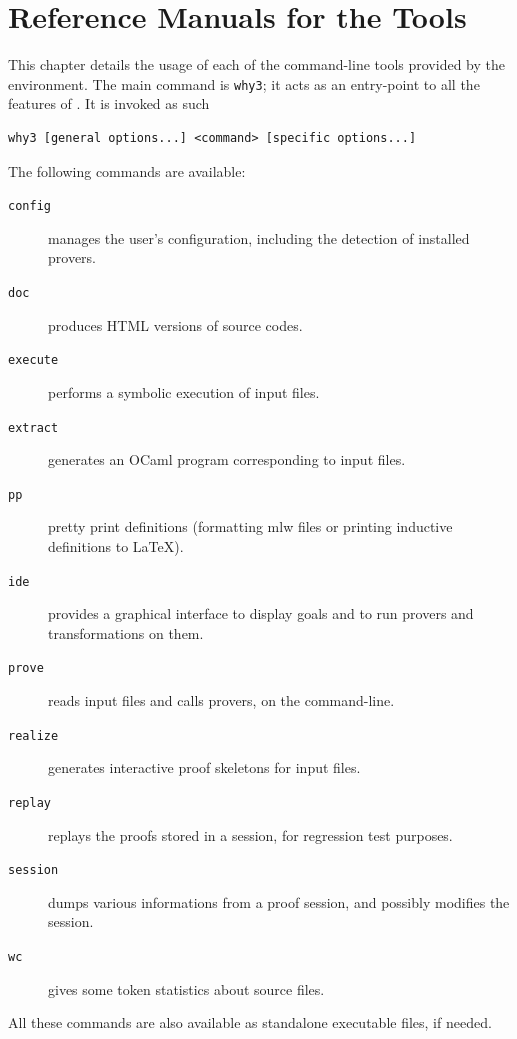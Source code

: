 \chapter{Reference Manuals for the \why Tools}
\label{chap:manpages}

This chapter details the usage of each of the command-line tools
provided by the \why environment. The main command is \texttt{why3};
it acts as an entry-point to all the features of \why. It is invoked
as such
\begin{verbatim}
why3 [general options...] <command> [specific options...]
\end{verbatim}

The following commands are available:
\begin{description}
\item[\texttt{config}] manages the user's configuration,
  including the detection of installed provers.
\item[\texttt{doc}] produces HTML versions of \why source codes.
\item[\texttt{execute}] performs a symbolic execution of \whyml
  input files.
\item[\texttt{extract}] generates an OCaml program corresponding to
  \whyml input files.
\item[\texttt{pp}] pretty print \whyml definitions (formatting mlw files
  or printing inductive definitions to \LaTeX).
\item[\texttt{ide}] provides a graphical interface to display goals
  and to run provers and transformations on them.
\item[\texttt{prove}] reads \whyml input files and calls
  provers, on the command-line.
\item[\texttt{realize}] generates interactive proof skeletons for
  \why input files.
\item[\texttt{replay}] replays the proofs stored in a session,
  for regression test purposes.
\item[\texttt{session}] dumps various informations from a proof
  session, and possibly modifies the session.
\item[\texttt{wc}] gives some token statistics about \whyml
  source files.
\end{description}

All these commands are also available as standalone executable files,
if needed.

